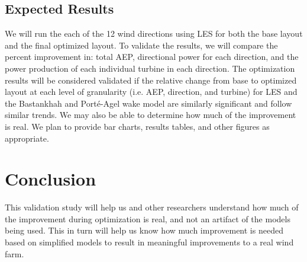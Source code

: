 \documentclass[conf]{new-aiaa}
\begin{document}



\subsection{Expected Results}
We will run the each of the 12 wind directions using LES for both the base layout and the final optimized layout. To validate the results, we will compare the percent improvement in: total AEP,  directional power for each direction, and the power production of each individual turbine in each direction. The optimization results will be considered validated if the relative change from base to optimized layout at each level of granularity (i.e. AEP, direction, and turbine) for LES and the Bastankhah and Port\'{e}-Agel wake model are similarly significant and follow similar trends. We may also be able to determine how much of the improvement is real. We plan to provide bar charts, results tables, and other figures as appropriate.

\section{Conclusion}
This validation study will help us and other researchers understand how much of the improvement during optimization is real, and not an artifact of the models being used. This in turn will help us know how much improvement is needed based on simplified models to result in meaningful improvements to a real wind farm. 

\clearpage



\end{document}
